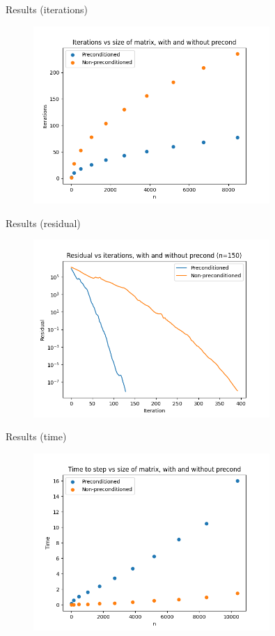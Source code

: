 \documentclass[11pt,aspectratio=1610]{beamer}
\begin{document}
\begin{frame}{Results (iterations)}
\begin{figure}
	\includegraphics[width=0.8\textwidth]{../images/iterations_test.png}
\end{figure}
\end{frame}

\begin{frame}{Results (residual)}
\begin{figure}
	\includegraphics[width=0.8\textwidth]{../images/residual_test.png}
\end{figure}
\end{frame}

\begin{frame}{Results (time)}
\begin{figure}
	\includegraphics[width=0.8\textwidth]{../images/time_test.png}
\end{figure}
\end{frame}
\end{document}
